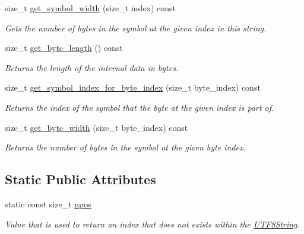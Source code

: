 \begin{DoxyCompactItemize}
size\-\_\-t \hyperlink{classchaos_1_1str_1_1_u_t_f8_string_a0c54a7cfaf4a3c1881b0c933c49a4922}{get\-\_\-symbol\-\_\-width} (size\-\_\-t index) const 
\begin{DoxyCompactList}\small\item\em Gets the number of bytes in the symbol at the given index in this string. \end{DoxyCompactList}\item 
size\-\_\-t \hyperlink{classchaos_1_1str_1_1_u_t_f8_string_a9312a6aac333d68a87066d6f222d119a}{get\-\_\-byte\-\_\-length} () const 
\begin{DoxyCompactList}\small\item\em Returns the length of the internal data in bytes. \end{DoxyCompactList}\item 
size\-\_\-t \hyperlink{classchaos_1_1str_1_1_u_t_f8_string_aa005c8b0243343ec7308d00fa6e72846}{get\-\_\-symbol\-\_\-index\-\_\-for\-\_\-byte\-\_\-index} (size\-\_\-t byte\-\_\-index) const 
\begin{DoxyCompactList}\small\item\em Returns the index of the symbol that the byte at the given index is part of. \end{DoxyCompactList}\item 
size\-\_\-t \hyperlink{classchaos_1_1str_1_1_u_t_f8_string_a387abdce2189a379961844cd0a42a97a}{get\-\_\-byte\-\_\-width} (size\-\_\-t byte\-\_\-index) const 
\begin{DoxyCompactList}\small\item\em Returns the number of bytes in the symbol at the given byte index. \end{DoxyCompactList}\end{DoxyCompactItemize}
\subsection*{Static Public Attributes}
\begin{DoxyCompactItemize}
\item 
\hypertarget{classchaos_1_1str_1_1_u_t_f8_string_a7e301ebfad4cd1b14e3a13cb0595b43b}{static const size\-\_\-t \hyperlink{classchaos_1_1str_1_1_u_t_f8_string_a7e301ebfad4cd1b14e3a13cb0595b43b}{npos}}\label{classchaos_1_1str_1_1_u_t_f8_string_a7e301ebfad4cd1b14e3a13cb0595b43b}

\begin{DoxyCompactList}\small\item\em Value that is used to return an index that does not exists within the \hyperlink{classchaos_1_1str_1_1_u_t_f8_string}{U\-T\-F8\-String}. \end{DoxyCompactList}\end{DoxyCompactItemize}


